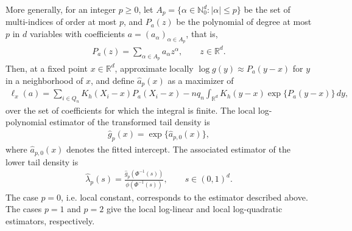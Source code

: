 \documentclass[12pt, headinclude=true]{scrartcl}
\begin{document}
More generally, for an integer $p\ge0$, let $A_p = \{\alpha\in\mathbb N_0^d:|\alpha|\le p\}$ be the set of multi-indices of order at most $p$, and
$P_a(z)$ be the polynomial of degree at most $p$ in $d$ variables with coefficients $a=(a_\alpha)_{\alpha\in A_p}$, that is,
\begin{align*}
  P_a(z)
  =
  \sum_{\alpha\in A_p} a_\alpha z^\alpha,
  \qquad z\in\mathbb R^d.
\end{align*}
Then, at a fixed point $x\in\mathbb R^d$, approximate locally $\log g(y)
\approx
P_a(y-x)$ for $y$ in a neighborhood of $x$,
and define $\hat a_p(x)$ as a maximizer of
\begin{align*}
  \ell_x(a)
  =
  \sum_{i \in Q_n}
  K_h(X_i-x)P_a(X_i-x)
  -
  nq_n
  \int_{\mathbb R^d}
  K_h(y-x)\exp\{P_a(y-x)\}\,dy,
\end{align*}
over the set of coefficients for which the integral is finite.
The local log-polynomial estimator of the transformed tail density is
\begin{align*}
  \hat g_p(x)
  =
  \exp\{\hat a_{p,0}(x)\},
\end{align*}
where $\hat a_{p,0}(x)$ denotes the fitted intercept. The associated
estimator of the lower tail density is
\begin{align*}
  \hat\lambda_p(s)
  =
  \frac{
    \hat g_p(\Phi^{-1}(s))
  }{
    \phi(\Phi^{-1}(s))
  },
  \qquad s\in(0,1)^d.
\end{align*}
The case $p=0$, i.e. local constant, corresponds to the estimator described above.
The cases $p=1$ and $p=2$ give the local log-linear and local
log-quadratic estimators, respectively.



\end{document}
